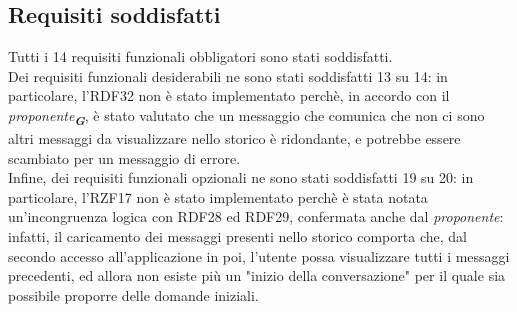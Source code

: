 \subsection{Requisiti soddisfatti}
\label{sec:requisiti_soddisfatti}

Tutti i 14 requisiti funzionali obbligatori sono stati soddisfatti.\\
Dei requisiti funzionali desiderabili ne sono stati soddisfatti 13 su 14: in particolare, l'RDF32 non è stato implementato perchè, in accordo con il \emph{proponente}\textsubscript{\textbf{\textit{G}}}, è stato valutato che un messaggio che comunica che non ci sono altri messaggi da visualizzare nello storico è ridondante, e potrebbe essere scambiato per un messaggio di errore.\\
Infine, dei requisiti funzionali opzionali ne sono stati soddisfatti 19 su 20: in particolare, l'RZF17 non è stato implementato perchè è stata notata un'incongruenza logica con RDF28 ed RDF29, confermata anche dal \emph{proponente}: infatti, il caricamento dei messaggi presenti nello storico comporta che, dal secondo accesso all'applicazione in poi, l'utente possa visualizzare tutti i messaggi precedenti, ed allora non esiste più un "inizio della conversazione" per il quale sia possibile proporre delle domande iniziali.
